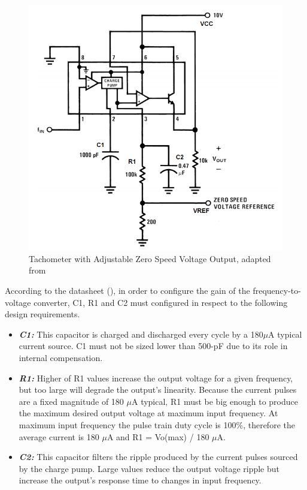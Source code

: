 			\begin{figure}[htbp]
				\centering
				\includegraphics[width=.8\textwidth]{figuras/fig-lm2907-minimum-component-tachometer.png}
				\caption{Tachometer with Adjustable Zero Speed Voltage Output, adapted from \cite{lm2907-minimum-component-tachometer}}
				\label{fig:lm2907-minimum-component-tachometer}
			\end{figure}

			According to the datasheet (\cite{lm2907-datasheet}), in order to configure the gain of the frequency-to-voltage converter, C1, R1 and C2 must configured in respect to the following design requirements.

			\begin{itemize}
				\item\textbf{\textit{C1:}} This capacitor is charged and discharged every cycle by a 180$\mu$A typical current source. C1 must not be sized lower than 500-pF due to its role in internal compensation.\label{itm:lm2907-c1}
				\item\textbf{\textit{R1:}} Higher of R1 values increase the output voltage for a given frequency, but too large will degrade the output’s linearity. Because the current pulses are a fixed magnitude of 180 $\mu$A  typical, R1 must be big enough to produce the maximum desired output voltage at maximum input frequency. At maximum input frequency the pulse train duty cycle is 100$\%$, therefore the average current is 180 $\mu$A and R1 = Vo(max) / 180 $\mu$A.\label{itm:lm2907-r1}
				\item\textbf{\textit{C2:}} This capacitor filters the ripple produced by the current pulses sourced by the charge pump. Large values reduce the output voltage ripple but increase the output’s response time to changes in input frequency.\label{itm:lm2907-c2}
			\end{itemize}


